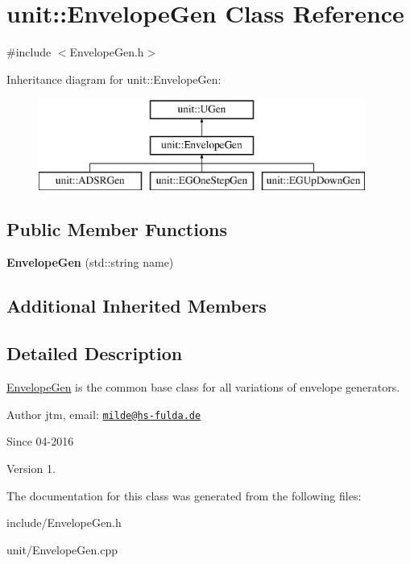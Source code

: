 \hypertarget{classunit_1_1EnvelopeGen}{\section{unit\-:\-:Envelope\-Gen Class Reference}
\label{classunit_1_1EnvelopeGen}
}


{\ttfamily \#include $<$Envelope\-Gen.\-h$>$}

Inheritance diagram for unit\-:\-:Envelope\-Gen\-:\begin{figure}[H]
\begin{center}
\leavevmode
\includegraphics[height=3.000000cm]{classunit_1_1EnvelopeGen}
\end{center}
\end{figure}
\subsection*{Public Member Functions}
\begin{DoxyCompactItemize}
\item 
\hypertarget{classunit_1_1EnvelopeGen_a2925f305c08e3316c3b1cbdabea03bde}{{\bfseries Envelope\-Gen} (std\-::string name)}\label{classunit_1_1EnvelopeGen_a2925f305c08e3316c3b1cbdabea03bde}

\end{DoxyCompactItemize}
\subsection*{Additional Inherited Members}


\subsection{Detailed Description}
\hyperlink{classunit_1_1EnvelopeGen}{Envelope\-Gen} is the common base class for all variations of envelope generators.

\begin{DoxyAuthor}{Author}
jtm, email\-:  \href{mailto:milde@hs-fulda.de}{\tt milde@hs-\/fulda.\-de} 
\end{DoxyAuthor}
\begin{DoxySince}{Since}
04-\/2016 
\end{DoxySince}
\begin{DoxyVersion}{Version}
1. 
\end{DoxyVersion}


The documentation for this class was generated from the following files\-:\begin{DoxyCompactItemize}
\item 
include/Envelope\-Gen.\-h\item 
unit/Envelope\-Gen.\-cpp\end{DoxyCompactItemize}
